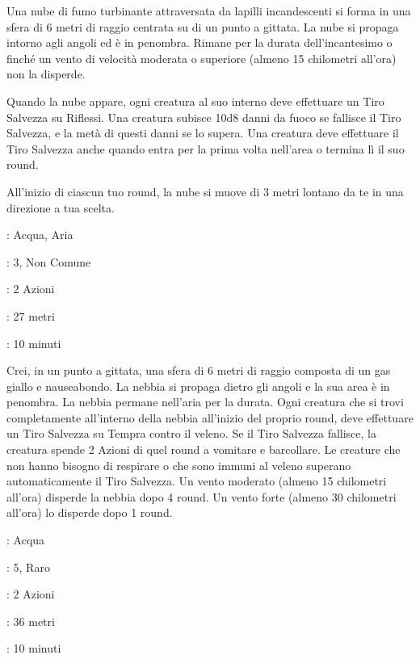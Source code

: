 \begin{multicols}{2}
Una nube di fumo turbinante attraversata da lapilli incandescenti si forma in una sfera di 6 metri di raggio centrata su di un punto a gittata. La nube si propaga intorno agli angoli ed è in penombra. Rimane per la durata dell'incantesimo o finché un vento di velocità moderata o superiore (almeno 15 chilometri all'ora) non la disperde.

Quando la nube appare, ogni creatura al suo interno deve effettuare un Tiro Salvezza su Riflessi. Una creatura subisce 10d8 danni da fuoco se fallisce il Tiro Salvezza, e la metà di questi danni se lo supera. Una creatura deve effettuare il Tiro Salvezza anche quando entra per la prima volta nell'area o termina lì il suo round.

All'inizio di ciascun tuo round, la nube si muove di 3 metri lontano da te in una direzione a tua scelta.

\noindent\colorbox{OBSSgold!10}{
\begin{minipage}{0.95\linewidth}
\begin{description}[noitemsep, topsep=0pt, parsep=0pt, partopsep=0pt, leftmargin=0cm, labelwidth=1.3cm]
	\item[\textbf{Lista}]: Acqua, Aria
	\item[\textbf{Livello}]: 3, Non Comune
	\item[\textbf{Lancio}]: 2 Azioni
	\item[\textbf{Gittata}]: 27 metri
	\item[\textbf{Durata}]: 10 minuti
\end{description}
\end{minipage}}\smallskip

Crei, in un punto a gittata, una sfera di 6 metri di raggio composta di un gas giallo e nauseabondo. La nebbia si propaga dietro gli angoli e la sua area è in penombra. La nebbia permane nell'aria per la durata. Ogni creatura che si trovi completamente all'interno della nebbia all'inizio del proprio round, deve effettuare un Tiro Salvezza su Tempra contro il veleno. Se il Tiro Salvezza fallisce, la creatura spende 2 Azioni di quel round a vomitare e barcollare. Le creature che non hanno bisogno di respirare o che sono immuni al veleno superano automaticamente il Tiro Salvezza. Un vento moderato (almeno 15 chilometri all'ora) disperde la nebbia dopo 4 round. Un vento forte (almeno 30 chilometri all'ora) lo disperde dopo 1 round.

\noindent\colorbox{OBSSgold!10}{
\begin{minipage}{0.95\linewidth}
\begin{description}[noitemsep, topsep=0pt, parsep=0pt, partopsep=0pt, leftmargin=0cm, labelwidth=1.3cm]
	\item[\textbf{Lista}]: Acqua
	\item[\textbf{Livello}]: 5, Raro
	\item[\textbf{Lancio}]: 2 Azioni
	\item[\textbf{Gittata}]: 36 metri
	\item[\textbf{Durata}]: 10 minuti
\end{description}
\end{minipage}}\smallskip


\end{multicols}
